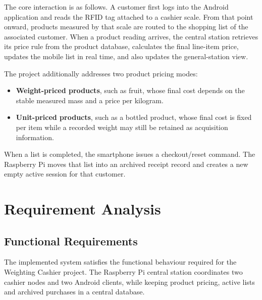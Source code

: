 \documentclass[11pt,a4paper]{article}
\begin{document}
The core interaction is as follows. A customer first logs into the Android application and reads the RFID tag attached to a cashier scale. From that point onward, products measured by that scale are routed to the shopping list of the associated customer. When a product reading arrives, the central station retrieves its price rule from the product database, calculates the final line-item price, updates the mobile list in real time, and also updates the general-station view.

The project additionally addresses two product pricing modes:
\begin{itemize}
    \item \textbf{Weight-priced products}, such as fruit, whose final cost depends on the stable measured mass and a price per kilogram.
    \item \textbf{Unit-priced products}, such as a bottled product, whose final cost is fixed per item while a recorded weight may still be retained as acquisition information.
\end{itemize}

When a list is completed, the smartphone issues a checkout/reset command. The Raspberry Pi moves that list into an archived receipt record and creates a new empty active session for that customer.

\section{Requirement Analysis}

\subsection{Functional Requirements}

The implemented system satisfies the functional behaviour required for the Weighting Cashier project. The Raspberry Pi central station coordinates two cashier nodes and two Android clients, while keeping product pricing, active lists and archived purchases in a central database.
\end{document}
